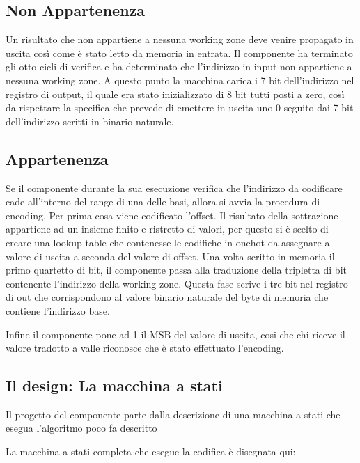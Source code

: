 \documentclass{article}
\begin{document}
\subsection{Non Appartenenza}

Un risultato che non appartiene a nessuna working zone deve venire propagato in uscita così come è stato letto da memoria in entrata. Il componente ha terminato gli otto cicli di verifica e ha determinato che l'indirizzo in input non appartiene a nessuna working zone. A questo punto la macchina carica i 7 bit dell'indirizzo nel registro di output, il quale era stato inizializzato di 8 bit tutti posti a zero, così da rispettare la specifica che prevede di emettere in uscita uno 0 seguito dai 7 bit dell'indirizzo scritti in binario naturale.

\subsection{Appartenenza}

Se il componente durante la sua esecuzione verifica che l'indirizzo da codificare cade all'interno del range di una delle basi, allora si avvia la procedura di encoding. Per prima cosa viene codificato l'offset. Il risultato della sottrazione appartiene ad un insieme finito e ristretto di valori, per questo si è scelto di creare una lookup table che contenesse le codifiche in onehot da assegnare al valore di uscita a seconda del valore di offset.
Una volta scritto in memoria il primo quartetto di bit, il componente passa alla traduzione della tripletta di bit contenente l'indirizzo della working zone. Questa fase scrive i tre bit nel registro di out che corrispondono al valore binario naturale del byte di memoria che contiene l'indirizzo base.

Infine il componente pone ad 1 il MSB del valore di uscita, cosi che chi riceve il valore tradotto a valle riconosce che è stato effettuato l'encoding.

\subsection{Il design: La macchina a stati}

Il progetto del componente parte dalla descrizione di una macchina a stati che esegua l'algoritmo poco fa descritto

La macchina a stati completa che esegue la codifica è disegnata qui:

\end{document}
